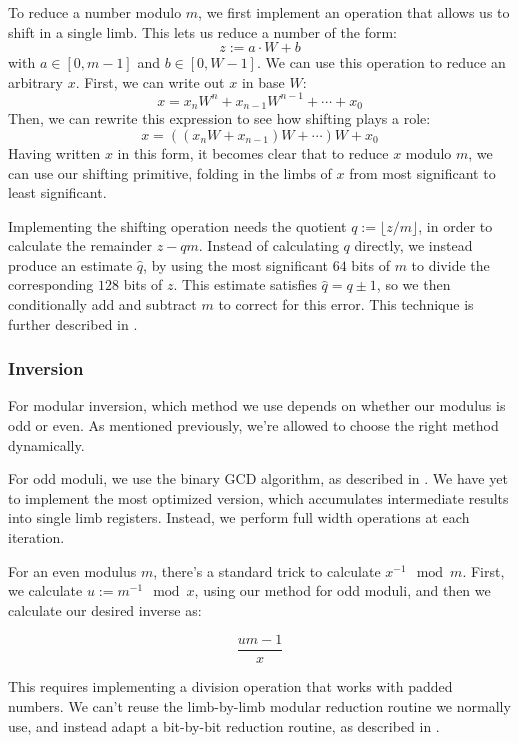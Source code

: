 \documentclass[11pt, a4paper]{article} %
\begin{document}
{To reduce a number modulo $m$, we first implement an operation
that allows us to shift in a single limb. This
lets us reduce a number
of the form:
$$
z := a \cdot W + b
$$
with $a \in [0, m - 1]$ and $b \in [0, W - 1]$. We can use
this operation to reduce an arbitrary $x$. First, we can
write out
$x$ in base $W$:
$$
x = x_n W^n + x_{n -1}W^{n - 1} + \cdots + x_0
$$
Then, we can rewrite this expression to see how
shifting plays a role:
$$
x = ((x_n W + x_{n - 1})W + \cdots)W + x_0
$$
Having written $x$ in this form, it becomes clear that to reduce
$x$ modulo $m$, we can use our shifting primitive, folding
in the limbs of $x$ from most significant to least significant.

Implementing the shifting operation needs
the quotient $q := \lfloor z / m \rfloor$,
in order to calculate the remainder $z - q m$.
Instead of calculating $q$ directly, we instead
produce an estimate $\hat{q}$, by using the most significant
$64$ bits of $m$ to divide the corresponding $128$ bits of $z$.
This estimate satisfies $\hat{q} = q \pm 1$, so we then
conditionally add and subtract $m$ to correct
for this error.
This technique is further described in \cite{pornin_bearssl_2020-1}.

\subsubsection{Inversion}

For modular inversion, which method we use depends on whether
our modulus is odd or even. As mentioned previously,
we're allowed to choose the right method dynamically.

For odd moduli, we use
the binary GCD algorithm, as described in \cite{pornin_optimized_2020}.
We have yet to implement the most optimized version, which accumulates
intermediate results into single limb registers. Instead, we
perform full width operations at each iteration.

For an even modulus $m$,
there's a standard trick to calculate $x^{-1} \mod m$.
First, we calculate
$u := m^{-1} \mod x$,
using our method for odd moduli,
and then we calculate our desired inverse as:

$$
\frac{um - 1}{x}
$$

This requires implementing a division operation that works
with padded numbers. We can't reuse the
limb-by-limb modular reduction
routine we normally use, and instead adapt
a bit-by-bit reduction routine, as described in
\cite{pornin_bearssl_2020-1}.

}
\end{document}
